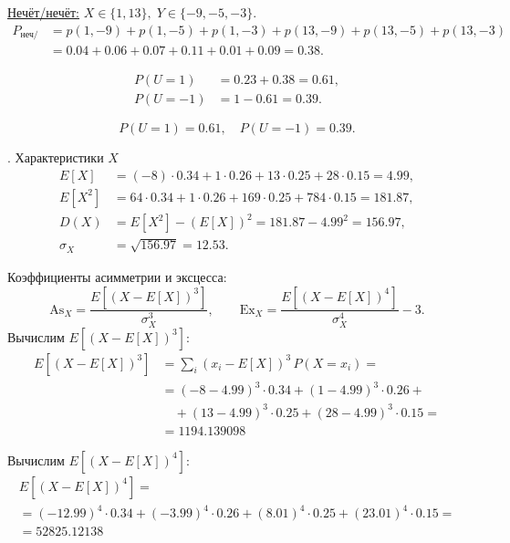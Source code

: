 \documentclass[a4paper,14pt]{extarticle}
\begin{document}
        \noindent\underline{Нечёт/нечёт:} $X \in \{1, 13\}, \; Y \in \{-9, -5, -3\}$.
        \[
        \begin{aligned}
        P_{\text{неч/неч}} &= p(1,-9) + p(1,-5) + p(1,-3) + p(13,-9) + p(13,-5) + p(13,-3) \\
        &= 0.04 + 0.06 + 0.07 + 0.11 + 0.01 + 0.09 = 0.38.
        \end{aligned}
        \]

        \[
        \begin{aligned}
        P(U=1) &= 0.23 + 0.38 = 0.61,\\
        P(U=-1) &= 1 - 0.61 = 0.39.
        \end{aligned}
        \]

        \[
        \boxed{P(U=1)=0.61, \quad P(U=-1)=0.39.}
        \]


        . Характеристики $X$
        \[
        \begin{aligned}
        E[X] &= (-8)\cdot0.34 + 1\cdot0.26 + 13\cdot0.25 + 28\cdot0.15 = 4.99, \\
        E[X^2] &= 64\cdot0.34 + 1\cdot0.26 + 169\cdot0.25 + 784\cdot0.15 = 181.87, \\
        D(X) &= E[X^2] - (E[X])^2 = 181.87 - 4.99^2 = 156.97, \\
        \sigma_X &= \sqrt{156.97} = 12.53.
        \end{aligned}
        \]

        Коэффициенты асимметрии и эксцесса:
        \[
        \mathrm{As}_X = \frac{E[(X - E[X])^3]}{\sigma_X^3}, 
        \qquad
        \mathrm{Ex}_X = \frac{E[(X - E[X])^4]}{\sigma_X^4} - 3.
        \]
        Вычислим $E[(X - E[X])^3]$:
        \[
        \begin{aligned}
        E[(X - E[X])^3] &= \sum_i (x_i - E[X])^3 \, P(X=x_i) = \\
        &= (-8 - 4.99)^3 \cdot 0.34 + (1 - 4.99)^3 \cdot 0.26 + \\
        &\quad + (13 - 4.99)^3 \cdot 0.25 + (28 - 4.99)^3 \cdot 0.15 = \\
        &= 1194.139098
        \end{aligned}
        \]

        Вычислим $E[(X - E[X])^4]$:
        \begin{gather*}
        E[(X - E[X])^4] = \\
        = (-12.99)^4 \cdot 0.34 + (-3.99)^4 \cdot 0.26 + (8.01)^4 \cdot 0.25 + (23.01)^4 \cdot 0.15 = \\
        = 52825.12138
        \end{gather*}
\end{document}
